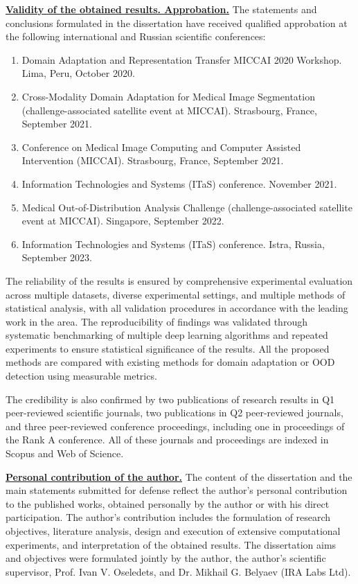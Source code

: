 \underline{\textbf{Validity of the obtained results. Approbation.}} The statements and conclusions formulated in the dissertation have received qualified approbation at the following international and Russian scientific conferences:

\begin{enumerate}
	\item Domain Adaptation and Representation Transfer MICCAI 2020 Workshop. Lima, Peru, October 2020.
    \item Cross-Modality Domain Adaptation for Medical Image Segmentation (challenge-associated satellite event at MICCAI). Strasbourg, France, September 2021.
    \item Conference on Medical Image Computing and Computer Assisted Intervention (MICCAI). Strasbourg, France, September 2021.
    \item Information Technologies and Systems (ITaS) conference. November 2021.
    \item Medical Out-of-Distribution Analysis Challenge (challenge-associated satellite event at MICCAI). Singapore, September 2022.
    \item Information Technologies and Systems (ITaS) conference. Istra, Russia, September 2023.
\end{enumerate}

The reliability of the results is ensured by comprehensive experimental evaluation across multiple datasets, diverse experimental settings, and multiple methods of statistical analysis, with all validation procedures in accordance with the leading work in the area. The reproducibility of findings was validated through systematic benchmarking of multiple deep learning algorithms and repeated experiments to ensure statistical significance of the results. All the proposed methods are compared with existing methods for domain adaptation or OOD detection using measurable metrics.

The credibility is also confirmed by two publications of research results in Q1 peer-reviewed scientific journals, two publications in Q2 peer-reviewed journals, and three peer-reviewed conference proceedings, including one in proceedings of the Rank A conference. All of these journals and proceedings are indexed in Scopus and Web of Science.


\underline{\textbf{Personal contribution of the author.}}
The content of the dissertation and the main statements submitted for defense reflect the author’s personal contribution to the published works, obtained personally by the author or with his direct participation. The author’s contribution includes the formulation of research objectives, literature analysis, design and execution of extensive computational experiments, and interpretation of the obtained results. The dissertation aims and objectives were formulated jointly by the author, the author’s scientific supervisor, Prof. Ivan V. Oseledets, and Dr. Mikhail G. Belyaev (IRA Labs Ltd).

